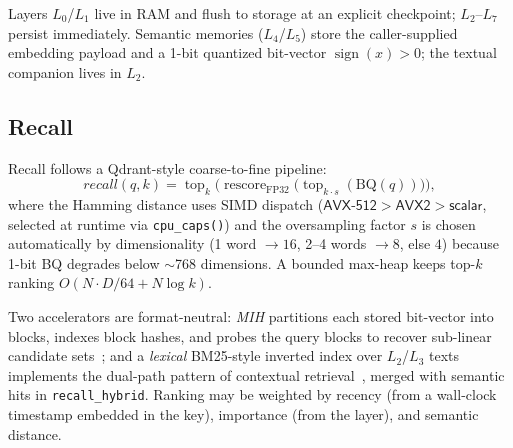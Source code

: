 \documentclass[11pt,twocolumn]{article}
\begin{document}
Layers $L_0$/$L_1$ live in RAM and flush to storage at an explicit
checkpoint; $L_2$--$L_7$ persist immediately. Semantic memories ($L_4$/$L_5$)
store the caller-supplied embedding payload and a 1-bit quantized bit-vector
$\operatorname{sign}(x)>0$; the textual companion lives in $L_2$.

\subsection{Recall}
\label{sec:recall}

Recall follows a Qdrant-style coarse-to-fine pipeline:
\begin{equation}
\textit{recall}(q,k) = \operatorname{top}_k\!\big(
  \operatorname{rescore}_{\mathrm{FP32}}\big(
    \operatorname{top}_{k\cdot s}(\mathrm{BQ}(q))\big)\big),
\label{eq:recall}
\end{equation}
where the Hamming distance uses SIMD dispatch
($\mathsf{AVX\text{-}512} > \mathsf{AVX2} > \mathsf{scalar}$, selected at
runtime via \texttt{cpu\_caps()}) and the oversampling factor $s$ is chosen
automatically by dimensionality (1 word $\to 16$, 2--4 words $\to 8$, else
$4$) because 1-bit BQ degrades below $\sim$768 dimensions. A bounded
max-heap keeps top-$k$ ranking $O(N\cdot D/64 + N\log k)$.

Two accelerators are format-neutral: \emph{MIH} partitions each stored
bit-vector into blocks, indexes block hashes, and probes the query blocks to
recover sub-linear candidate sets~\cite{mih}; and a \emph{lexical} BM25-style
inverted index over $L_2$/$L_3$ texts implements the dual-path pattern of
contextual retrieval~\cite{contextual}, merged with semantic hits in
\texttt{recall\_hybrid}. Ranking may be weighted by recency (from a
wall-clock timestamp embedded in the key), importance (from the layer), and
semantic distance.
\end{document}
